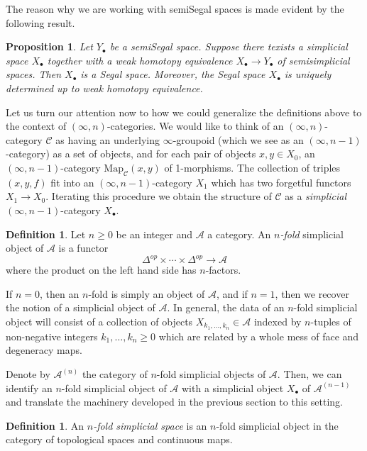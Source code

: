 \documentclass[a4paper,11pt]{article}
\newcommand{\acal}{\mathcal{A}}
\newcommand{\ccal}{\mathcal{C}}
\theoremstyle{plain}
\newtheorem{prop}[thm]{Proposition}
\theoremstyle{definition}
\newtheorem{defi}[thm]{Definition}
\theoremstyle{remark}
\begin{document}
The reason why we are working with semiSegal spaces is made evident by the following result. 

\begin{prop}
\label{semisegal}
Let $Y_{\bullet}$ be a semiSegal space. Suppose there texists a simplicial space $X_{\bullet}$ together with a weak homotopy equivalence $X_{\bullet} \to Y_{\bullet}$ of semisimplicial spaces. Then $X_{\bullet}$ is a Segal space. Moreover, the Segal space $X_{\bullet}$ is uniquely determined up to weak homotopy equivalence. 
\end{prop}




Let us turn our attention now to how we could generalize the definitions above to the context of $(\infty, n)$-categories. We would like to think of an $(\infty, n)$-category $\ccal$ as having an underlying $\infty$-groupoid (which we see as an $(\infty, n-1)$-category) as a set of objects, and for each pair of objects $x, y \in X_0$, an $(\infty, n-1)$-category $\text{Map}_{\ccal}(x,y)$ of 1-morphisms. The collection of triples $(x,y, f)$ fit into an $(\infty, n-1)$-category $X_1$ which has two forgetful functors $X_1 \to X_0$. Iterating this procedure we obtain the structure of $\ccal$ as a \textit{simplicial} $(\infty, n-1)$-category $X_{\bullet}$. 

\begin{defi}
Let $n \geq 0$ be an integer and $\acal$ a category. An \textit{$n$-fold} simplicial object of $\acal$ is a functor 
$$\Delta^{op} \times \cdots \times \Delta^{op} \to \acal$$
where the product on the left hand side has $n$-factors.
\end{defi}

If $n = 0$, then an $n$-fold is simply an object of $\acal$, and if $n = 1$, then we recover the notion of a simplicial object of $\acal$. In general, the data of an $n$-fold simplicial object will consist of a collection of objects $X_{k_1, \dots , k_n} \in \acal$ indexed by $n$-tuples of non-negative integers $k_1, \dots , k_n \geq 0$ which are related by a whole mess of face and degeneracy maps. 

Denote by $\acal^{(n)}$ the category of $n$-fold simplicial objects of $\acal$. Then, we can identify an $n$-fold simplicial object of $\acal$ with a simplicial object $X_{\bullet}$ of $\acal^{(n-1)}$ and translate the machinery developed in the previous section to this setting. 

\begin{defi}
An \textit{$n$-fold simplicial space} is an $n$-fold simplicial object in the category of topological spaces and continuous maps.
\end{defi}
\end{document}
